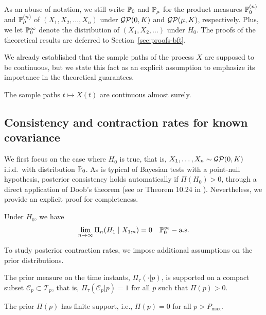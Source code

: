 As an abuse of notation, we still write \(\mathbb{P}_0\) and \(\mathbb{P}_\mu\) for the product measures \(\mathbb{P}_0^{(n)}\) and \(\mathbb{P}_{\mu}^{(n)}\) of \((X_1,X_2,\dots, X_n)\) under \(\operatorname{\mathcal{GP}}(0, K)\) and \(\operatorname{\mathcal{GP}}(\mu, K)\), respectively. Plus, we let \(\mathbb{P}_0^\infty\) denote the distribution of \((X_1,X_2,\dots)\) under \(H_0\). The proofs of the theoretical results are deferred to Section~\ref{sec:proofs-bft}.

We already established that the sample paths of the process \(X\) are supposed to be continuous, but we state this fact as an explicit assumption to emphasize its importance in the theoretical guarantees.

\begin{assumption}\label{ass:continuous-paths}
  The sample paths \(t \mapsto X(t)\) are continuous almost surely.
\end{assumption}

\subsection{Consistency and contraction rates for known covariance}\label{sec:consistency-known}

We first focus on the case where \(H_0\) is true, that is, \(X_1,\dots,X_n \sim \operatorname{\mathcal{GP}}(0, K)\) i.i.d.\ with distribution \(\mathbb{P}_0\). As is typical of Bayesian tests with a point-null hypothesis, posterior consistency holds automatically if \(\Pi(H_0)>0\), through a direct application of Doob's theorem (see \citealp{dass2004note} or Theorem 10.24 in \citealp{ghosal2017fundamentals}). Nevertheless, we provide an explicit proof for completeness.

\begin{theorem}\label{th:consistency-h0}
  Under \(H_0\), we have 
  \[
    \lim_{n\to\infty} \Pi_n(H_1\mid X_{1:n}) = 0\quad \mathbb{P}_0^\infty-\text{a.s.}
  \]
\end{theorem}

To study posterior contraction rates, we impose additional assumptions on the prior distributions.

\begin{assumption}\label{ass:compact-support-tau}
  The prior measure on the time instants, \(\Pi_\tau(\cdot|p)\), is supported on a compact subset \(\mathcal C_p\subset \mathcal T_p\), that is, \(\Pi_\tau(\mathcal C_p|p)=1\) for all \(p\) such that \(\Pi(p)>0\).
\end{assumption}
\begin{assumption}\label{ass:prior-p-finite}
  The prior \(\Pi(p)\) has finite support, i.e., \(\Pi(p) = 0\) for all \(p > P_{\max}\).
\end{assumption}

